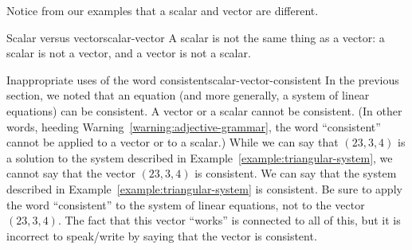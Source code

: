 \documentclass{book}
\theoremstyle{ekimcustom}
\begin{document}
Notice from our examples that a scalar and vector are different.
\begin{bwarning}{Scalar versus vector}{scalar-vector}
A scalar is not the same thing as a vector: a scalar is not a vector, and a vector is not a scalar.
\end{bwarning}
\begin{bwarning}{Inappropriate uses of the word consistent}{scalar-vector-consistent}
In the previous section, we noted that an equation (and more generally, a system of linear equations) can be consistent. A vector or a scalar cannot be consistent. (In other words, heeding Warning~\ref{warning:adjective-grammar}, the word ``consistent'' cannot be applied to a vector or to a scalar.)
\vskip6pt
While we can say that $(23,3,4)$ is a solution to the system described in Example~\ref{example:triangular-system}, we cannot say that the vector $(23,3,4)$ is consistent. We can say that the system described in Example~\ref{example:triangular-system} is consistent. Be sure to apply the word ``consistent'' to the system of linear equations, not to the vector $(23,3,4)$. The fact that this vector ``works'' is connected to all of this, but it is incorrect to speak/write by saying that the vector is consistent.
\end{bwarning}
\end{document}
